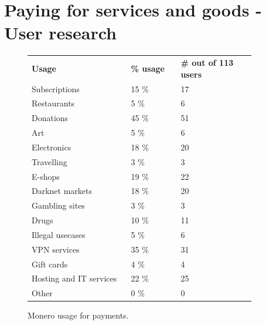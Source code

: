 \documentclass[
  printed, %
  table,   %
  lof,     %
  lot,     %
           oneside, color
]{fithesis3}
\begin{document}
\chapter{Paying for services and goods - User research}
\begin{figure}[H]
\center
\begin{tabular}{p{0.4\linewidth}p{0.2\linewidth}p{0.3\linewidth}}
\textbf{Usage}          & \textbf{\% usage} & \textbf{\# out of 113 users} \\
Subscriptions           & 15 \%             & 17                           \\
Restaurants             & 5 \%              & 6                            \\
Donations               & 45 \%             & 51                           \\
Art                     & 5 \%              & 6                            \\
Electronics             & 18 \%             & 20                           \\
Travelling              & 3 \%              & 3                            \\
E-shops                 & 19 \%             & 22                           \\
Darknet markets         & 18 \%             & 20                           \\
Gambling sites          & 3 \%              & 3                            \\
Drugs                   & 10 \%             & 11                           \\
Illegal usecases        & 5 \%              & 6                            \\
VPN services            & 35 \%             & 31                           \\
Gift cards              & 4 \%              & 4                            \\
Hosting and IT services & 22 \%             & 25                           \\
Other                   & 0 \%              & 0                           
\end{tabular}
\caption{Monero usage for payments.}
\label{table:moneropayusageresearch}
\end{figure}
\end{document}
